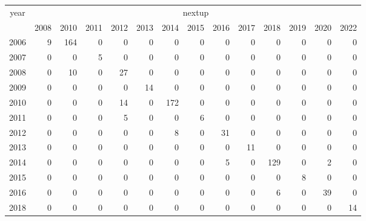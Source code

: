 \footnotesize\begin{tabular}[t]{lrrrrrrrrrrrrr}
\toprule
\multicolumn{1}{c}{year} & \multicolumn{13}{c}{nextup} \\
\cmidrule(l{3pt}r{3pt}){1-1} \cmidrule(l{3pt}r{3pt}){2-14}
  & 2008 & 2010 & 2011 & 2012 & 2013 & 2014 & 2015 & 2016 & 2017 & 2018 & 2019 & 2020 & 2022\\
\midrule
2006 & 9 & 164 & 0 & 0 & 0 & 0 & 0 & 0 & 0 & 0 & 0 & 0 & 0\\
2007 & 0 & 0 & 5 & 0 & 0 & 0 & 0 & 0 & 0 & 0 & 0 & 0 & 0\\
2008 & 0 & 10 & 0 & 27 & 0 & 0 & 0 & 0 & 0 & 0 & 0 & 0 & 0\\
2009 & 0 & 0 & 0 & 0 & 14 & 0 & 0 & 0 & 0 & 0 & 0 & 0 & 0\\
2010 & 0 & 0 & 0 & 14 & 0 & 172 & 0 & 0 & 0 & 0 & 0 & 0 & 0\\
2011 & 0 & 0 & 0 & 5 & 0 & 0 & 6 & 0 & 0 & 0 & 0 & 0 & 0\\
2012 & 0 & 0 & 0 & 0 & 0 & 8 & 0 & 31 & 0 & 0 & 0 & 0 & 0\\
2013 & 0 & 0 & 0 & 0 & 0 & 0 & 0 & 0 & 11 & 0 & 0 & 0 & 0\\
2014 & 0 & 0 & 0 & 0 & 0 & 0 & 0 & 5 & 0 & 129 & 0 & 2 & 0\\
2015 & 0 & 0 & 0 & 0 & 0 & 0 & 0 & 0 & 0 & 0 & 8 & 0 & 0\\
2016 & 0 & 0 & 0 & 0 & 0 & 0 & 0 & 0 & 0 & 6 & 0 & 39 & 0\\
2018 & 0 & 0 & 0 & 0 & 0 & 0 & 0 & 0 & 0 & 0 & 0 & 0 & 14\\
\bottomrule
\end{tabular}
